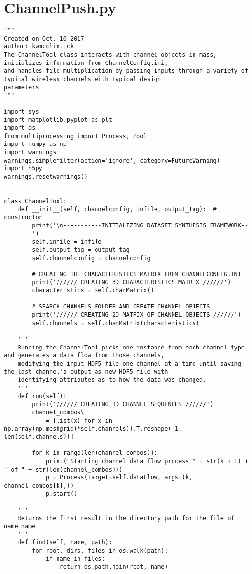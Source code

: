 \section{ChannelPush.py}
\begin{lstlisting}[breaklines]
"""
Created on Oct, 10 2017
author: kwmcclintick
The ChannelTool class interacts with channel objects in mass, initializes information from ChannelConfig.ini,
and handles file multiplication by passing inputs through a variety of typical wireless channels with typical design
parameters
"""

import sys
import matplotlib.pyplot as plt
import os
from multiprocessing import Process, Pool
import numpy as np
import warnings
warnings.simplefilter(action='ignore', category=FutureWarning)
import h5py
warnings.resetwarnings()


class ChannelTool:
    def __init__(self, channelconfig, infile, output_tag):  # constructor
        print('\n-----------INITIALIZING DATASET SYNTHESIS FRAMEWORK----------')
        self.infile = infile
        self.output_tag = output_tag
        self.channelconfig = channelconfig

        # CREATING THE CHARACTERISTICS MATRIX FROM CHANNELCONFIG.INI
        print('////// CREATING 3D CHARACTERISTICS MATRIX //////')
        characteristics = self.charMatrix()

        # SEARCH CHANNELS FOLDER AND CREATE CHANNEL OBJECTS
        print('////// CREATING 2D MATRIX OF CHANNEL OBJECTS //////')
        self.channels = self.chanMatrix(characteristics)

    '''
    Running the ChannelTool picks one instance from each channel type and generates a data flow from those channels,
    modifying the input HDF5 file one channel at a time until saving the last channel's output as new HDF5 file with
    identifying attributes as to how the data was changed.
    '''
    def run(self):
        print('////// CREATING 1D CHANNEL SEQUENCES //////')
        channel_combos\
            = [list(x) for x in np.array(np.meshgrid(*self.channels)).T.reshape(-1, len(self.channels))]

        for k in range(len(channel_combos)):
            print("Starting channel data flow process " + str(k + 1) + " of " + str(len(channel_combos)))
            p = Process(target=self.dataFlow, args=(k, channel_combos[k],))
            p.start()

    '''
    Returns the first result in the directory path for the file of name name
    '''
    def find(self, name, path):
        for root, dirs, files in os.walk(path):
            if name in files:
                return os.path.join(root, name)


\end{lstlisting}

